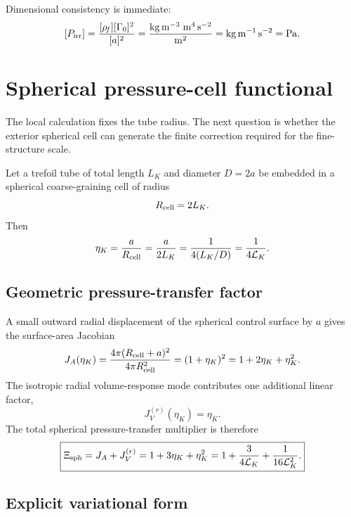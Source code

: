 \documentclass[11pt]{article}
\newcommand{\rhof}{\rho_{\!f}}
\newcommand{\LK}{\mathcal L_K}
\newcommand{\Xisph}{\Xi_{\rm sph}}
\begin{document}
Dimensional consistency is immediate:
\[
  [P_{\rm irr}]
  =
  \frac{[\rhof][\Gamma_0]^2}{[a]^2}
  =
  \frac{\mathrm{kg\,m^{-3}}\;\mathrm{m^4\,s^{-2}}}{\mathrm{m^2}}
  =
  \mathrm{kg\,m^{-1}\,s^{-2}}
  =
  \mathrm{Pa}.
\]

\section{Spherical pressure-cell functional}
\label{sec:spherical}

The local calculation fixes the tube radius.  The next question is whether the exterior
spherical cell can generate the finite correction required for the fine-structure scale.

Let a trefoil tube of total length \(L_K\) and diameter \(D=2a\) be embedded in a spherical
coarse-graining cell of radius
\begin{equation}
  R_{\rm cell}=2L_K.
  \label{eq:Rcell}
\end{equation}
Then
\begin{equation}
  \eta_K
  =
  \frac{a}{R_{\rm cell}}
  =
  \frac{a}{2L_K}
  =
  \frac{1}{4(L_K/D)}
  =
  \frac{1}{4\LK}.
  \label{eq:eta}
\end{equation}

\subsection{Geometric pressure-transfer factor}

A small outward radial displacement of the spherical control surface by \(a\) gives the
surface-area Jacobian
\begin{equation}
  J_A(\eta_K)
  =
  \frac{4\pi(R_{\rm cell}+a)^2}{4\pi R_{\rm cell}^2}
  =
  (1+\eta_K)^2
  =
  1+2\eta_K+\eta_K^2.
  \label{eq:JA}
\end{equation}
The isotropic radial volume-response mode contributes one additional linear factor,
\begin{equation}
  J_V^{(r)}(\eta_K)=\eta_K.
  \label{eq:JV}
\end{equation}
The total spherical pressure-transfer multiplier is therefore
\begin{equation}
  \boxed{
  \Xisph
  =
  J_A+J_V^{(r)}
  =
  1+3\eta_K+\eta_K^2
  =
  1+\frac{3}{4\LK}+\frac{1}{16\LK^2}.
  }
  \label{eq:Xi}
\end{equation}

\subsection{Explicit variational form}
\end{document}
